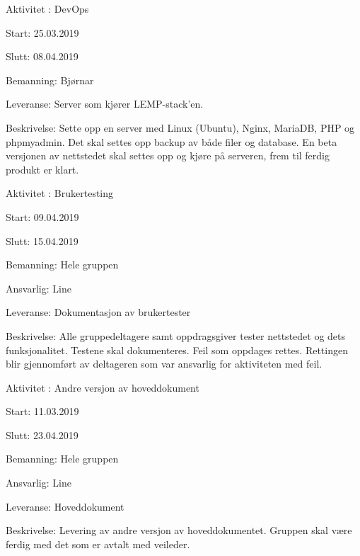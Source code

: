 \documentclass[11pt,a4paper]{report}
\begin{document}
\begin{compactdesc}
	\item [Aktivitet \arabic{aktivitetTeller}:] DevOps
	\begin{compactitem}
	\item Start: 25.03.2019
	\item Slutt: 08.04.2019
	\item Bemanning: Bjørnar
	\item Leveranse: Server som kjører LEMP-stack'en.
	\item Beskrivelse: Sette opp en server med Linux (Ubuntu), Nginx, MariaDB, PHP og phpmyadmin. Det skal settes opp backup av både filer og database. En beta versjonen av nettstedet skal settes opp og kjøre på serveren, frem til ferdig produkt er klart.
	\addtocounter{aktivitetTeller}{1}
	\end{compactitem}
	
	\item [Aktivitet \arabic{aktivitetTeller}:] Brukertesting
	\begin{compactitem}
	\item Start: 09.04.2019
	\item Slutt: 15.04.2019
	\item Bemanning: Hele gruppen
	\item Ansvarlig: Line
	\item Leveranse: Dokumentasjon av brukertester
	\item Beskrivelse: Alle gruppedeltagere samt oppdragsgiver tester nettstedet og dets funksjonalitet. Testene skal dokumenteres. Feil som oppdages rettes. Rettingen blir gjennomført av deltageren som var ansvarlig for aktiviteten med feil.
	\addtocounter{aktivitetTeller}{1}
	\end{compactitem}
	
	\item [Aktivitet \arabic{aktivitetTeller}:] Andre versjon av hoveddokument 
	\begin{compactitem}
	\item Start: 11.03.2019
	\item Slutt: 23.04.2019
	\item Bemanning: Hele gruppen
	\item Ansvarlig: Line
	\item Leveranse: Hoveddokument
	\item Beskrivelse: Levering av andre versjon av hoveddokumentet. Gruppen skal være ferdig med det som er avtalt med veileder.
	\addtocounter{aktivitetTeller}{1}
	\end{compactitem}
	

\end{compactdesc}
\end{document}
